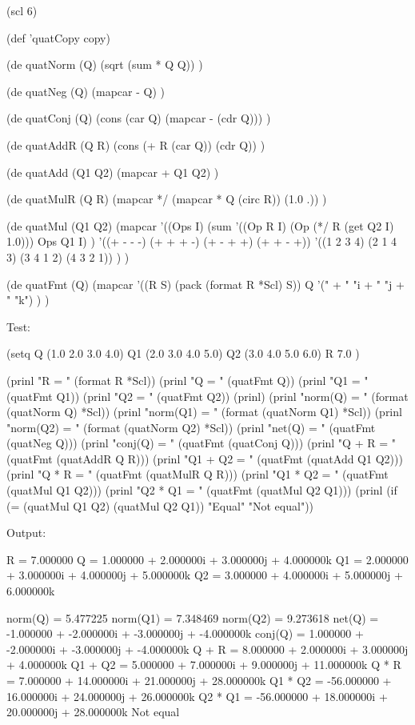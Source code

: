 \begin{wideverbatim}

(scl 6)

(def 'quatCopy copy)

(de quatNorm (Q)
   (sqrt (sum * Q Q)) )

(de quatNeg (Q)
   (mapcar - Q) )

(de quatConj (Q)
   (cons (car Q) (mapcar - (cdr Q))) )

(de quatAddR (Q R)
   (cons (+ R (car Q)) (cdr Q)) )

(de quatAdd (Q1 Q2)
   (mapcar + Q1 Q2) )

(de quatMulR (Q R)
   (mapcar */ (mapcar * Q (circ R)) (1.0 .)) )

(de quatMul (Q1 Q2)
   (mapcar
      '((Ops I)
         (sum '((Op R I) (Op (*/ R (get Q2 I) 1.0))) Ops Q1 I) )
      '((+ - - -) (+ + + -) (+ - + +) (+ + - +))
      '((1 2 3 4) (2 1 4 3) (3 4 1 2) (4 3 2 1)) ) )

(de quatFmt (Q)
   (mapcar '((R S) (pack (format R *Scl) S))
      Q
      '(" + " "i + " "j + " "k") ) )


\end{wideverbatim}

\begin{wideverbatim}


Test:

(setq
   Q (1.0 2.0 3.0 4.0)
   Q1 (2.0 3.0 4.0 5.0)
   Q2 (3.0 4.0 5.0 6.0)
   R 7.0 )

(prinl "R  = " (format R *Scl))
(prinl "Q  = " (quatFmt Q))
(prinl "Q1 = " (quatFmt Q1))
(prinl "Q2 = " (quatFmt Q2))
(prinl)
(prinl "norm(Q)  = " (format (quatNorm Q) *Scl))
(prinl "norm(Q1) = " (format (quatNorm Q1) *Scl))
(prinl "norm(Q2) = " (format (quatNorm Q2) *Scl))
(prinl "net(Q)   = " (quatFmt (quatNeg Q)))
(prinl "conj(Q)  = " (quatFmt (quatConj Q)))
(prinl "Q + R    = " (quatFmt (quatAddR Q R)))
(prinl "Q1 + Q2  = " (quatFmt (quatAdd Q1 Q2)))
(prinl "Q * R    = " (quatFmt (quatMulR Q R)))
(prinl "Q1 * Q2  = " (quatFmt (quatMul Q1 Q2)))
(prinl "Q2 * Q1  = " (quatFmt (quatMul Q2 Q1)))
(prinl (if (= (quatMul Q1 Q2) (quatMul Q2 Q1)) "Equal" "Not equal"))

Output:

R  = 7.000000
Q  = 1.000000 + 2.000000i + 3.000000j + 4.000000k
Q1 = 2.000000 + 3.000000i + 4.000000j + 5.000000k
Q2 = 3.000000 + 4.000000i + 5.000000j + 6.000000k

norm(Q)  = 5.477225
norm(Q1) = 7.348469
norm(Q2) = 9.273618
net(Q)   = -1.000000 + -2.000000i + -3.000000j + -4.000000k
conj(Q)  = 1.000000 + -2.000000i + -3.000000j + -4.000000k
Q + R    = 8.000000 + 2.000000i + 3.000000j + 4.000000k
Q1 + Q2  = 5.000000 + 7.000000i + 9.000000j + 11.000000k
Q * R    = 7.000000 + 14.000000i + 21.000000j + 28.000000k
Q1 * Q2  = -56.000000 + 16.000000i + 24.000000j + 26.000000k
Q2 * Q1  = -56.000000 + 18.000000i + 20.000000j + 28.000000k
Not equal

\end{wideverbatim}

